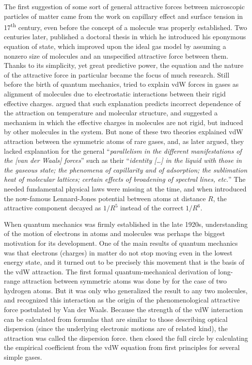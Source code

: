 The first suggestion of some sort of general attractive forces between microscopic particles of matter came from the work on capillary effect and surface tension in 17\textsuperscript{th} century, even before the concept of a molecule was properly established.
Two centuries later, \citet{vanderWaals73} published a doctoral thesis in which he introduced his eponymous equation of state, which improved upon the ideal gas model by assuming a nonzero size of molecules and an unspecified attractive force between them.
Thanks to its simplicity, yet great predictive power, the equation and the nature of the attractive force in particular became the focus of much research.
Still before the birth of quantum mechanics, \citet{KeesomPK12a} tried to explain vdW forces in gases as alignment of molecules due to electrostatic interactions between their rigid effective charges.
\citet{DebyePZ20} argued that such explanation predicts incorrect dependence of the attraction on temperature and molecular structure, and suggested a mechanism in which the effective charges in molecules are not rigid, but induced by other molecules in the system.
But none of these two theories explained vdW attraction between the symmetric atoms of rare gases, and, as \citet{LondonTFS37} later argued, they lacked explanation for the general ``\emph{parallelism in the different manifestations of the \emph{[van der Waals]} forces}'' such as their ``\emph{identity \emph{[\ldots]} in the liquid with those in the gaseous state; the phenomena of capillarity and of adsorption; the sublimation heat of molecular lattices; certain effects of broadening of spectral lines, etc.}''
The needed fundamental physical laws were missing at the time, and when \citet{JonesPRSLA24} introduced the now-famous Lennard-Jones potential between atoms at distance $R$, the attractive component decayed as $1/R^5$ instead of the correct $1/R^6$.

When quantum mechanics was firmly established in the late 1920s, understanding of the motion of electrons in atoms and molecules was perhaps the biggest motivation for its development.
One of the main results of quantum mechanics was that electrons (charges) in matter do not stop moving even in the lowest energy state, and it turned out to be precisely this movement that is the basis of the vdW attraction.
The first formal quantum-mechanical derivation of long-range attraction between symmetric atoms was done by \citet{WangPZ27} for the case of two hydrogen atoms.
But it was only \citet{LondonZP30} who generalized the result to any two molecules, and recognized this interaction as the origin of the phenomenological attractive force postulated by Van der Waals.
Because the strength of the vdW interaction can be calculated from formulas that are similar to those describing optical dispersion (since the underlying electronic motions are of related kind), the attraction was called the dispersion force.
\citet{SlaterPR31} then closed the full circle by calculating the empirical coefficient from the vdW equation from first principles for several simple gases.

